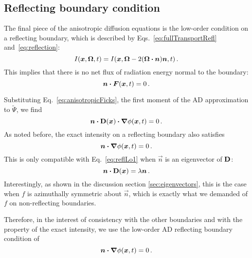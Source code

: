 \subsection{Reflecting boundary condition}
The final piece of the anisotropic diffusion equations is the low-order
condition on a reflecting boundary, which is described by
Eqs.~\eqref{eq:fullTransportRefl} and~\eqref{eq:reflection}:
\begin{equation*}
  I(\bm{x}, \bm{\Omega}, t)
  = I(\bm{x}, \bm{\Omega} - 2(\bm{\Omega} \bm{\cdot} \bm{n}) \bm{n}, t) \,.
\end{equation*}
This implies that there is no net flux of radiation energy normal to the
boundary:
\begin{equation}\label{eq:reflFirst}
  \bm{n} \bm{\cdot} \bm{F}(\bm{x}, t) = 0\,.
\end{equation}

Substituting Eq.~\eqref{eq:anisotropicFicks}, the first moment of the AD
approximation to $\tilde\Psi$, we find
\begin{equation}\label{eq:reflLo1}
  \bm{n} \bm{\cdot} \mathbf{D}(\bm{x}) \bm{\cdot} \bm{\nabla} \phi(\bm{x}, t) = 0\,.
\end{equation}
As noted before, the exact intensity on a reflecting boundary also satisfies
\begin{equation}\label{eq:reflZeroth}
  \bm{n}\bm{\cdot}\bm{\nabla} \phi(\bm{x}, t) = 0 \,.
\end{equation}
This is only compatible with Eq.~\eqref{eq:reflLo1} when $\vec{n}$ is an
eigenvector of $\mathbf{D}$:
\begin{equation*}
  \bm{n} \bm{\cdot} \mathbf{D}(\bm{x}) = \lambda \bm{n}\,.
\end{equation*}
Interestingly, as shown in the discussion section \ref{sec:eigenvectors}, this is the case when $f$ is
azimuthally symmetric about
$\vec{n}$, which is exactly what we demanded of $f$ on non-reflecting boundaries.

Therefore, in the interest of consistency with the other boundaries and with the
property of the exact intensity, we use the low-order AD reflecting boundary
condition of
\begin{equation}\label{eq:reflLo2}
  \bm{n} \bm{\cdot} \bm{\nabla} \phi(\bm{x}, t) = 0\,.
\end{equation}


